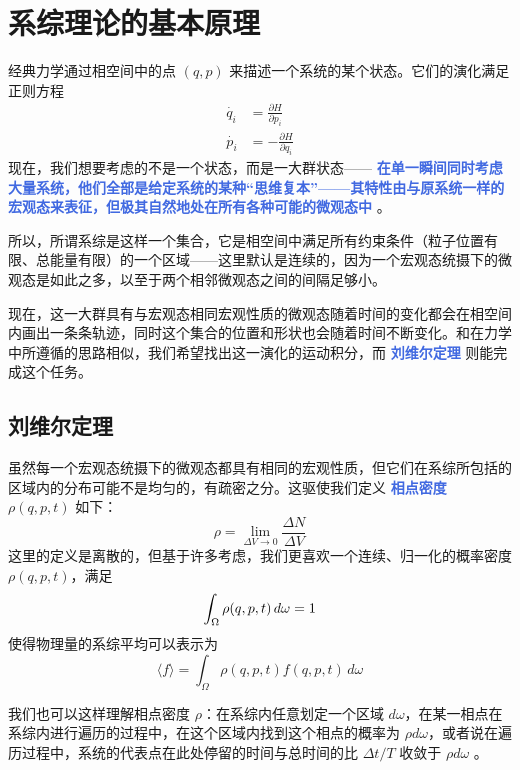 
\chapter{系综理论的基本原理}\label{cha:系综理论的基本原理}

经典力学通过相空间中的点 $(q,p)$ 来描述一个系统的某个状态。它们的演化满足正则方程
\begin{align}
    \dot{q_i} &= \frac{\partial H}{\partial p_i} \\
    \dot{p_i} &= -\frac{\partial H}{\partial q_i}
\end{align}
现在，我们想要考虑的不是一个状态，而是一大群状态——  \textcolor{RoyalBlue}{\textbf{\kaishu 在单一瞬间同时考虑大量系统，他们全部是给定系统的某种“思维复本”——其特性由与原系统一样的宏观态来表征，但极其自然地处在所有各种可能的微观态中}} \cite{Pathria}。

所以，所谓系综是这样一个集合，它是相空间中满足所有约束条件（粒子位置有限、总能量有限）的一个区域——这里默认是连续的，因为一个宏观态统摄下的微观态是如此之多，以至于两个相邻微观态之间的间隔足够小。

现在，这一大群具有与宏观态相同宏观性质的微观态随着时间的变化都会在相空间内画出一条条轨迹，同时这个集合的位置和形状也会随着时间不断变化。和在力学中所遵循的思路相似，我们希望找出这一演化的运动积分，而 \textcolor{RoyalBlue}{\textbf{\kaishu 刘维尔定理}} 则能完成这个任务。

\section{刘维尔定理}\label{sec:刘维尔定理}

虽然每一个宏观态统摄下的微观态都具有相同的宏观性质，但它们在系综所包括的区域内的分布可能不是均匀的，有疏密之分。这驱使我们定义 \textcolor{RoyalBlue}{\textbf{\kaishu 相点密度}} $\rho(q,p,t)$ 如下：
\begin{equation}
    \rho = \lim_{\Delta V\rightarrow 0} \frac{\Delta N}{\Delta V} 
\end{equation}
这里的定义是离散的，但基于许多考虑，我们更喜欢一个连续、归一化的概率密度 $\rho(q,p,t)$，满足
\begin{equation}
    \int_\Omega \rho(q,p,t)\,d\omega = 1 \\
\end{equation}
使得物理量的系综平均可以表示为
\begin{equation}
    \langle f \rangle =  \int_\Omega \rho(q,p,t)f(q,p,t)\,d\omega
\end{equation}

我们也可以这样理解相点密度 $\rho$：在系综内任意划定一个区域 $d \omega$，在某一相点在系综内进行遍历的过程中，在这个区域内找到这个相点的概率为 $\rho d \omega$，或者说在遍历过程中，系统的代表点在此处停留的时间与总时间的比 $\Delta t / T$  收敛于 $\rho d \omega$ 。

